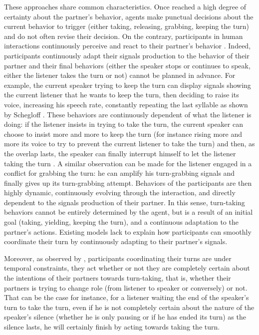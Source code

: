 These approaches share common characteristics. On\-ce reached a high degree of certainty about the partner's behavior, agents make punctual decisions about the current behavior to trigger (either taking, releasing, grabbing, keeping the turn) and do not often revise their decision.
On the contrary, participants in human interactions continuously perceive and react to their partner's behavior \citep{clancy_co-constructed_2015}. Indeed, participants continuously adapt their signals production to the behavior of their partner and their final behaviors (either the speaker stops or continues to speak, either the listener takes the turn or not) cannot be planned in advance. For example, the current speaker trying to keep the turn can display signals showing the current listener that he wants to keep the turn, then deciding to raise its voice, increasing his speech rate, constantly repeating the last syllable as shown by Schegloff \citep{schegloff_overlapping_2000}. These behaviors are continuously dependent of what the listener is doing: if the listener insists in trying to take the turn, the current speaker can choose to insist more and more to keep the turn (for instance rising more and more its voice to try to prevent the current listener to take the turn) and then, as the overlap lasts, the speaker can finally interrupt himself to let the listener taking the turn \citep{schegloff_overlapping_2000}.  
A similar observation can be made for the listener engaged in a conflict for grabbing the turn: he can amplify his turn-grabbing signals and finally gives up its turn-grabbing attempt.
 Behaviors of the participants are then highly dynamic, continuously evolving through the interaction, and directly dependent to the signals production of their partner. In this sense, turn-taking behaviors cannot be entirely determined by the agent, but is a result of an initial goal (taking, yielding, keeping the turn), and a continuous adaptation to the partner's actions. Existing models lack to explain how participants can smoothly coordinate their turn by continuously adapting to their partner's signals.  
 
Moreover, as observed by \cite{thorisson_natural_2002}, participants coordinating their turns are under temporal constraints, they act whether or not they are completely certain about the intentions of their partners towards turn-taking, that is, whether their partners is trying to change role (from listener to speaker or conversely) or not. That can be the case for instance, for a listener waiting the end of the speaker's turn to take the turn, even if he is not completely certain about the nature of the speaker's silence (whether he is only pausing or if he has ended its turn) as the silence lasts, he will certainly finish by acting towards taking the turn.
 	
